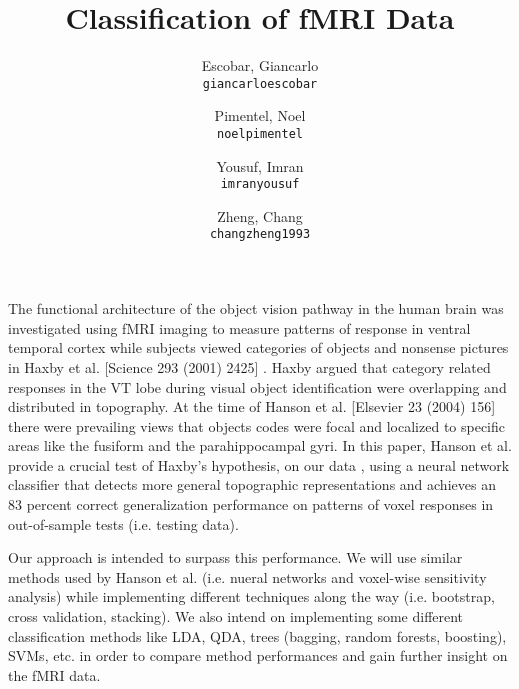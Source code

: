 \documentclass[11pt]{article}
\title{Classification of fMRI Data}
\author{
  Escobar, Giancarlo\\
  \texttt{giancarloescobar}
  \and
  Pimentel, Noel\\
  \texttt{noelpimentel}
  \and
  Yousuf, Imran\\
  \texttt{imranyousuf}
  \and
  Zheng, Chang\\
  \texttt{changzheng1993}
}
\begin{document}
\maketitle

The functional architecture of the object vision pathway in the human brain was investigated using fMRI imaging to measure patterns of response in ventral temporal cortex while subjects viewed categories of objects and nonsense pictures in Haxby et al. [Science 293 (2001) 2425]  . Haxby argued that category related responses in the VT lobe during visual object identification were overlapping and distributed in topography. At the time of Hanson et al. [Elsevier 23 (2004) 156] \cite {hanson2004combinatorial} there were prevailing views that objects codes were focal and localized to specific areas like the fusiform and the parahippocampal gyri.  In this paper, Hanson et al. provide a crucial test of Haxby's hypothesis, on our data \cite {haxby2001vor}, using a neural network classifier that detects more general topographic representations and achieves an 83 percent correct generalization performance on patterns of voxel responses in out-of-sample tests (i.e. testing data).  


Our approach is intended to surpass this performance.  We will use similar methods used by Hanson et al. (i.e. nueral networks and voxel-wise sensitivity analysis) while implementing different techniques along the way (i.e. bootstrap, cross validation, stacking). We also intend on implementing some different classification methods like LDA, QDA, trees (bagging, random forests, boosting), SVMs, etc. in order to compare method performances and gain further insight on the fMRI data.


\end{document}
